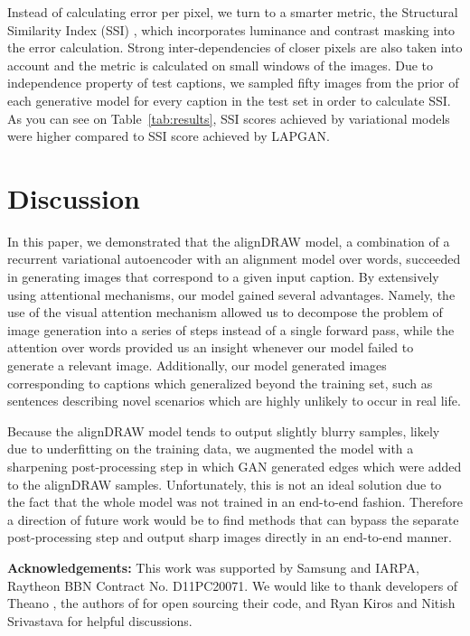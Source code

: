 \documentclass{article} %
\begin{document}
Instead of calculating error per pixel, we turn to a smarter metric, the Structural Similarity Index (SSI) \citep{wang_ssi}, which incorporates luminance and contrast masking into the error calculation. Strong inter-dependencies of closer pixels are also taken into account and the metric is calculated on small windows of the images. Due to independence property of test captions, we sampled fifty images from the prior of each generative model for every caption in the test set in order to calculate SSI. As you can see on Table~\ref{tab:results}, SSI scores achieved by variational models were higher compared to SSI score achieved by LAPGAN.

\section{Discussion}

In this paper, we demonstrated that the alignDRAW model, a combination of a recurrent variational autoencoder with an alignment model over words, succeeded in generating images that correspond to a given input caption. By extensively using attentional mechanisms, our model gained several advantages. Namely, the use of the visual attention mechanism allowed us to decompose the problem of image generation into a series of steps instead of a single forward pass, while the attention over words provided us an insight whenever our model failed to generate a relevant image. Additionally, our model generated images corresponding to captions which generalized beyond the training set, such as sentences describing novel scenarios which are highly unlikely to occur in real life.

Because the alignDRAW model tends to output slightly blurry samples, likely due to underfitting on the training data, we augmented the model with a sharpening post-processing step in which GAN generated edges which were added to the alignDRAW samples. Unfortunately, this is not an ideal solution due to the fact that the whole model was not trained in an end-to-end fashion. Therefore a direction of future work would be to find methods that can bypass the separate post-processing step and output sharp images directly in an end-to-end manner. 

{\small
{\bf Acknowledgements:}
This work was supported by Samsung and IARPA, Raytheon BBN Contract No. D11PC20071.
We would like to thank developers of Theano \citep{theano}, the authors of \citep{denton_lapgan} for open sourcing their code, and Ryan Kiros and Nitish Srivastava for helpful discussions. 
}

{\small


}

\newpage
\appendix

\end{document}
